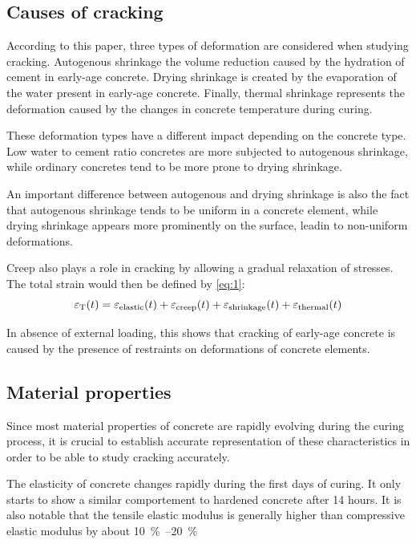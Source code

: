 \documentclass{report}
\begin{document}
\subsection{Causes of cracking}
According to this paper, three types of deformation are considered when
studying cracking. Autogenous shrinkage the volume reduction
caused by the hydration of cement in early-age concrete. Drying shrinkage is
created by the evaporation of the water present in early-age concrete. Finally,
thermal shrinkage represents the deformation caused by the changes in concrete
temperature during curing.

These deformation types have a different impact depending on the concrete type.
Low water to cement ratio concretes are more subjected to autogenous shrinkage, while
ordinary concretes tend to be more prone to drying shrinkage.

An important difference between autogenous and drying shrinkage is also the
fact that autogenous shrinkage tends to be uniform in a concrete element, while
drying shrinkage appears more prominently on the surface, leadin to non-uniform
deformations.

Creep also plays a role in cracking by allowing a gradual relaxation of
stresses. The total strain would then be defined by \autoref{eq:1}:
\begin{equation}
  \epsilon_{\text T}(t) =
  \epsilon_{\text{elastic}}(t) +
  \epsilon_{\text{creep}}(t) +
  \epsilon_{\text{shrinkage}}(t) +
  \epsilon_{\text{thermal}}(t)
  \label{eq:1}
\end{equation}

In absence of external loading, this shows that cracking of early-age concrete
is caused by the presence of restraints on deformations of concrete elements.

\subsection{Material properties}
Since most material properties of concrete are rapidly evolving during the
curing process, it is crucial to establish accurate representation of these
characteristics in order to be able to study cracking accurately.

The elasticity of concrete changes rapidly during the first days of curing. It
only starts to show a similar comportement to hardened concrete after 14 hours.
It is also notable that the tensile elastic modulus is generally higher than
compressive elastic modulus by about \SIrange{10}{20}\percent.

\printbibliography
\end{document}
